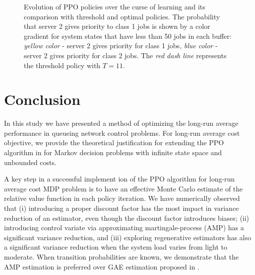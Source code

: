 \documentclass[11pt]{article}
\theoremstyle{definition}
\numberwithin{equation}{section}
\begin{document}
\begin{figure}[H]
\begin{center}
{     }\hspace{8pt}%
\hspace{8pt}%
\end{center}




\caption{Evolution of PPO policies over the curse of learning and its comparison with threshold and optimal policies.  The probability that server 2 gives priority to class 1 jobs is shown by a color gradient for system states that have less than 50 jobs in each buffer: \textit{yellow color}  - server 2 gives priority for class 1 jobs, \textit{blue color} - server 2 gives priority for class 2 jobs. The \textit{red dash line} represents the threshold policy with $T=11.$  }
     \label{fig:NmodelPolicies}
   \end{figure}





\section{Conclusion}

In this study we have presented a method of optimizing  the long-run average performance in queueing network control problems.
For long-run average cost objective,
we provide the theoretical justification for extending the PPO algorithm in \cite{Schulman2017} for Markov decision problems with infinite state space and unbounded costs.

 A key step in a successful implement ion of the PPO algorithm for
  long-run average cost MDP problem is to have an effective Monte
  Carlo estimate of the relative value function in each policy
  iteration. We have numerically observed that (i) introducing a
  proper discount factor has the most impact in variance reduction of
  an estimator, even though the discount factor introduces biases; (ii)
  introducing control variate via approximating martingale-process
  (AMP) has a significant variance reduction, and (iii) exploring
  regenerative estimators has also a significant variance reduction
  when the system load varies from light to moderate. When transition
  probabilities are known, we demonstrate that the AMP estimation is
  preferred over GAE estimation proposed in \cite{Schulman2015}.
\end{document}
